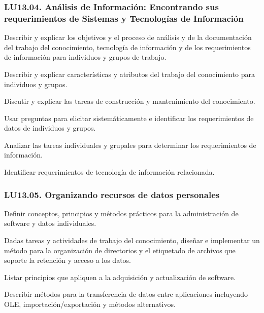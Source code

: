 \subsubsection{LU13.04. Análisis de Información: Encontrando sus requerimientos de Sistemas y Tecnologías de Información}\label{sec:BOK-LU13.04}\label{sec:LU13.04}
\begin{LearningUnit}
\begin{LUGoal}
\item Describir y explicar los objetivos y el proceso de análisis y de la documentación del trabajo del conocimiento, tecnología de información y de los requerimientos de información para individuos y grupos de trabajo.
\end{LUGoal}

\begin{LUObjective}
\item Describir y explicar características y atributos del trabajo del conocimiento para individuos y grupos.
\item Discutir y explicar las tareas de construcción y mantenimiento del conocimiento.
\item Usar preguntas para elicitar sistemáticamente e identificar los requerimientos de datos de individuos y grupos.
\item Analizar las tareas individuales y grupales para determinar los requerimientos de información.
\item Identificar requerimientos de tecnología de información relacionada.
\end{LUObjective}
\end{LearningUnit}

\subsubsection{LU13.05. Organizando recursos de datos personales}\label{sec:BOK-LU13.05}\label{sec:LU13.05}
\begin{LearningUnit}
\begin{LUGoal}
\item Definir conceptos, principios y métodos prácticos para la administración de software y datos individuales.
\end{LUGoal}

\begin{LUObjective}
\item Dadas tareas y actividades de trabajo del conocimiento, diseñar e implementar un método para la organización de directorios y el etiquetado de archivos que soporte la retención y acceso a los datos.
\item Listar principios que apliquen a la adquisición y actualización de software.
\item Describir métodos para la transferencia de datos entre aplicaciones incluyendo OLE, importación/exportación y métodos alternativos.
\end{LUObjective}
\end{LearningUnit}

